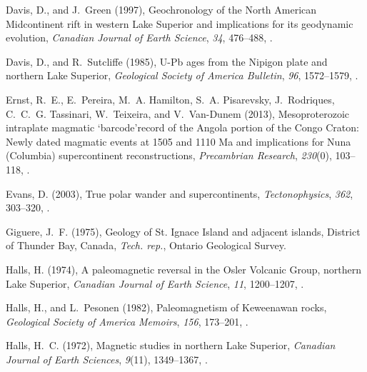 \documentclass[draft,gc]{AGUTeX}
\begin{document}
\begin{article}
\begin{thebibliography}{24}
Davis, D., and J.~Green (1997), Geochronology of the {N}orth {A}merican
  {M}idcontinent rift in western {L}ake {S}uperior and implications for its
  geodynamic evolution, \textit{Canadian Journal of Earth Science},
  \textit{34}, 476--488, .

Davis, D., and R.~Sutcliffe (1985), {U}-{P}b ages from the {N}ipigon plate and
  northern {L}ake {S}uperior, \textit{Geological Society of America Bulletin},
  \textit{96}, 1572--1579,
  .

Ernst, R.~E., E.~Pereira, M.~A. Hamilton, S.~A. Pisarevsky, J.~Rodriques,
  C.~C.~G. Tassinari, W.~Teixeira, and V.~Van-Dunem (2013), {Mesoproterozoic
  intraplate magmatic `barcode'record of the Angola portion of the Congo
  Craton: Newly dated magmatic events at 1505 and 1110 Ma and implications for
  Nuna (Columbia) supercontinent reconstructions}, \textit{Precambrian
  Research}, \textit{230}(0), 103--118, .

Evans, D. (2003), True polar wander and supercontinents,
  \textit{Tectonophysics}, \textit{362}, 303--320,
  .

Giguere, J.~F. (1975), {Geology of St. Ignace Island and adjacent islands,
  District of Thunder Bay, Canada}, \textit{Tech. rep.}, Ontario Geological
  Survey.

Halls, H. (1974), A paleomagnetic reversal in the {O}sler {V}olcanic {G}roup,
  northern {L}ake {S}uperior, \textit{Canadian Journal of Earth Science},
  \textit{11}, 1200--1207, .

Halls, H., and L.~Pesonen (1982), Paleomagnetism of {K}eweenawan rocks,
  \textit{Geological Society of America Memoirs}, \textit{156}, 173--201,
  .

Halls, H.~C. (1972), Magnetic studies in northern {L}ake {S}uperior,
  \textit{Canadian Journal of Earth Sciences}, \textit{9}(11), 1349--1367,
  .


\end{thebibliography}
\end{article}
\end{document}
